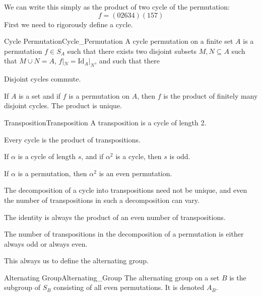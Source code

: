         We can write this simply as the product of two cycle of the permutation:
        \begin{equation}
            f=(02634)(157)
        \end{equation}
        First we need to rigorously define a cycle.
        \begin{fdefinition}{Cycle Permutation}{Cycle_Permutation}
            A cycle permutation on a finite set $A$ is a permutation
            $f\in{S}_{A}$ such that there exists two disjoint subsets
            $M,N\subseteq{A}$ such that $M\cup{N}=A$,
            $f|_{N}=\textrm{Id}_{A}|_{N}$, and such that there 
        \end{fdefinition}
        \begin{theorem}
            Disjoint cycles commute.
        \end{theorem}
        \begin{theorem}
            If $A$ is a set and if $f$ is a permutation on $A$, then $f$ is
            the product of finitely many disjoint cycles. The product is unique.
        \end{theorem}
        \begin{fdefinition}{Transposition}{Transposition}
            A transposition is a cycle of length 2.
        \end{fdefinition}
        \begin{theorem}
            Every cycle is the product of transpositions.
        \end{theorem}
        \begin{theorem}
            If $\alpha$ is a cycle of length $s$, and if $\alpha^{2}$ is a
            cycle, then $s$ is odd.
        \end{theorem}
        \begin{theorem}
            If $\alpha$ is a permutation, then $\alpha^{2}$ is an even
            permutation.
        \end{theorem}
        The decomposition of a cycle into transpositions need not be unique, and
        even the number of transpositions in such a decomposition can vary.
        \begin{theorem}
            The identity is always the product of an even number of
            transpositions.
        \end{theorem}
        \begin{theorem}
            The number of transpositions in the decomposition of a permutation
            is either always odd or always even.
        \end{theorem}
        This always us to define the alternating group.
        \begin{fdefinition}{Alternating Group}{Alternating_Group}
            The alternating group on a set $B$ is the subgroup of $S_{B}$
            consisting of all even permutations. It is denoted $A_{B}$.
        \end{fdefinition}
